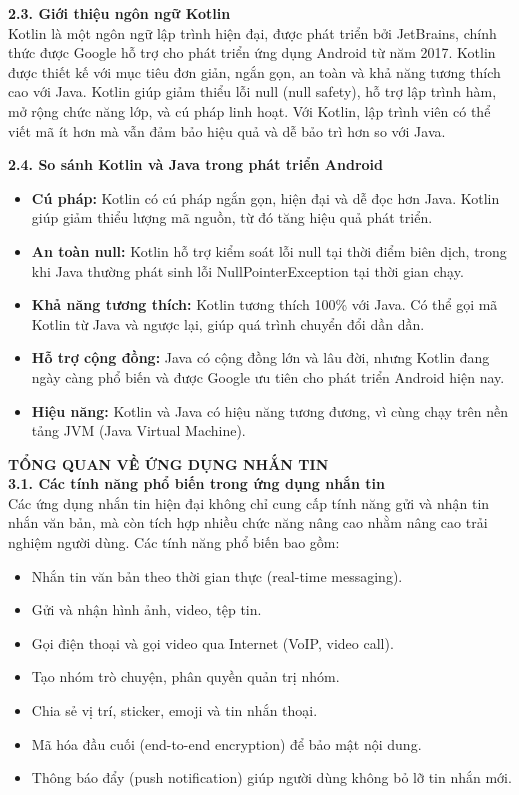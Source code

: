 \documentclass[12pt,a4paper]{article}
\begin{document}
	\textbf{2.3. Giới thiệu ngôn ngữ Kotlin} \\
	Kotlin là một ngôn ngữ lập trình hiện đại, được phát triển bởi JetBrains, chính thức được Google hỗ trợ cho phát triển ứng dụng Android từ năm 2017. Kotlin được thiết kế với mục tiêu đơn giản, ngắn gọn, an toàn và khả năng tương thích cao với Java. Kotlin giúp giảm thiểu lỗi null (null safety), hỗ trợ lập trình hàm, mở rộng chức năng lớp, và cú pháp linh hoạt. Với Kotlin, lập trình viên có thể viết mã ít hơn mà vẫn đảm bảo hiệu quả và dễ bảo trì hơn so với Java.
	
	\textbf{2.4. So sánh Kotlin và Java trong phát triển Android} \\
	\begin{itemize}
		\item \textbf{Cú pháp:} Kotlin có cú pháp ngắn gọn, hiện đại và dễ đọc hơn Java. Kotlin giúp giảm thiểu lượng mã nguồn, từ đó tăng hiệu quả phát triển.
		\item \textbf{An toàn null:} Kotlin hỗ trợ kiểm soát lỗi null tại thời điểm biên dịch, trong khi Java thường phát sinh lỗi NullPointerException tại thời gian chạy.
		\item \textbf{Khả năng tương thích:} Kotlin tương thích 100\% với Java. Có thể gọi mã Kotlin từ Java và ngược lại, giúp quá trình chuyển đổi dần dần.
		\item \textbf{Hỗ trợ cộng đồng:} Java có cộng đồng lớn và lâu đời, nhưng Kotlin đang ngày càng phổ biến và được Google ưu tiên cho phát triển Android hiện nay.
		\item \textbf{Hiệu năng:} Kotlin và Java có hiệu năng tương đương, vì cùng chạy trên nền tảng JVM (Java Virtual Machine).
	\end{itemize}
	\vspace{0.5cm}
	\textbf{TỔNG QUAN VỀ ỨNG DỤNG NHẮN TIN} \\
	
	\textbf{3.1. Các tính năng phổ biến trong ứng dụng nhắn tin} \\
	Các ứng dụng nhắn tin hiện đại không chỉ cung cấp tính năng gửi và nhận tin nhắn văn bản, mà còn tích hợp nhiều chức năng nâng cao nhằm nâng cao trải nghiệm người dùng. Các tính năng phổ biến bao gồm:
	\begin{itemize}
		\item Nhắn tin văn bản theo thời gian thực (real-time messaging).
		\item Gửi và nhận hình ảnh, video, tệp tin.
		\item Gọi điện thoại và gọi video qua Internet (VoIP, video call).
		\item Tạo nhóm trò chuyện, phân quyền quản trị nhóm.
		\item Chia sẻ vị trí, sticker, emoji và tin nhắn thoại.
		\item Mã hóa đầu cuối (end-to-end encryption) để bảo mật nội dung.
		\item Thông báo đẩy (push notification) giúp người dùng không bỏ lỡ tin nhắn mới.
	\end{itemize}
	
\end{document}
